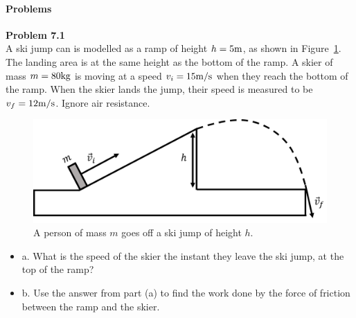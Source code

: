 \paragraph{Problems}

\begin{framed}
\textbf{Problem 7.1}\\
A ski jump can is modelled as a ramp of height $h=5 {\rm m}$, as shown in Figure~\ref{fig:workenergy:skijumpprob}. The landing area is at the same height as the bottom of the ramp. A skier of mass $m=80 {\rm kg}$ is moving at a speed $v_i=15 {\rm m/s}$ when they reach the bottom of the ramp. When the skier lands the jump, their speed is measured to be $v_f=12 {\rm m/s}$. Ignore air resistance.

\begin{figure}[!htbp]
\centering
\includegraphics[width=0.7\linewidth]{files/skijumpprob-7a4485948f1dc2b2671e28671fec477f.png}
\caption[]{A person of mass $m$ goes off a ski jump of height $h$.}
\label{fig:workenergy:skijumpprob}
\end{figure}

\begin{itemize}
\item a. What is the speed of the skier the instant they leave the ski jump, at the top of the ramp?
\item b. Use the answer from part (a) to find the work done by the force of friction between the ramp and the skier.
\end{itemize}
\end{framed}

